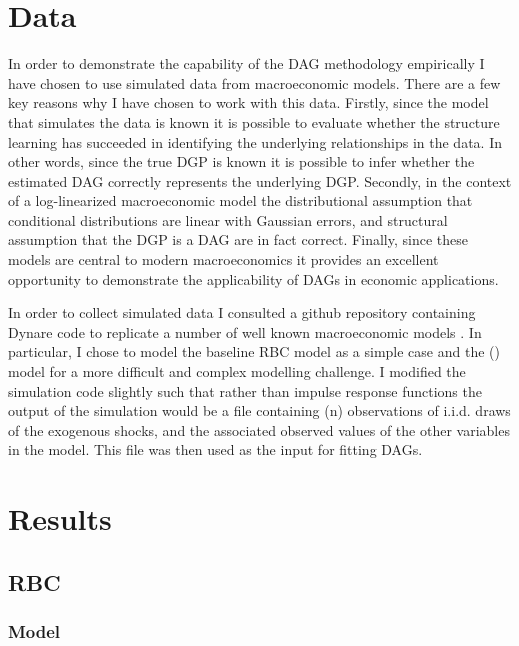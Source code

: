 \documentclass{article}
\begin{document}
\section{Data}

In order to demonstrate the capability of the DAG methodology empirically I have chosen to use simulated data from macroeconomic models. There are a few key reasons why I have chosen to work with this data. Firstly, since the model that simulates the data is known it is possible to evaluate whether the structure learning has succeeded in identifying the underlying relationships in the data. In other words, since the true DGP is known it is possible to infer whether the estimated DAG correctly represents the underlying DGP. Secondly, in the context of a log-linearized macroeconomic model the distributional assumption that conditional distributions are linear with Gaussian errors, and structural assumption that the DGP is a DAG are in fact correct. Finally, since these models are central to modern macroeconomics it provides an excellent opportunity to demonstrate the applicability of DAGs in economic applications.

In order to collect simulated data I consulted a github repository containing Dynare code to replicate a number of well known macroeconomic models \parencite{pfeifer2020}. In particular, I chose to model the baseline RBC model as a simple case and the \citeauthor{smets2007shocks} (\citeyear{smets2007shocks}) model for a more difficult and complex modelling challenge. I modified the simulation code slightly such that rather than impulse response functions the output of the simulation would be a file containing (n) observations of i.i.d. draws of the exogenous shocks, and the associated observed values of the other variables in the model. This file was then used as the input for fitting DAGs.

\section{Results}

\subsection{RBC}

\subsubsection{Model}
\end{document}
